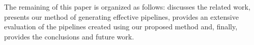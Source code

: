 The remaining of this paper is organized as follows:
 discusses the related work,
 presents our method of generating effective pipelines,
 provides an extensive evaluation of the pipelines created using our proposed method and, finally,  provides the conclusions and future work.






